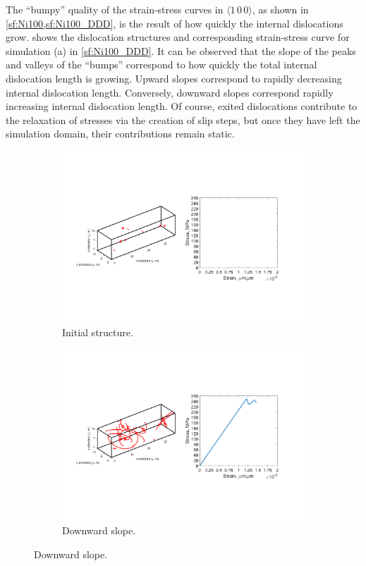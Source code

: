 The ``bumpy'' quality of the strain-stress curves in $\langle 1\, 0\, 0 \rangle$, as shown in \cref{sf:Ni100,sf:Ni100_DDD}, is the result of how quickly the internal dislocations grow.  shows the dislocation structures and corresponding strain-stress curve for simulation (a) in \cref{sf:Ni100_DDD}. It can be observed that the slope of the peaks and valleys of the ``bumps'' correspond to how quickly the total internal dislocation length is growing. Upward slopes correspond to rapidly decreasing internal dislocation length. Conversely, downward slopes correspond rapidly increasing internal dislocation length. Of course, exited dislocations contribute to the relaxation of stresses via the creation of slip steps, but once they have left the simulation domain, their contributions remain static.
\begin{figure}
    \centering
    \begin{subfigure}[t]{\linewidth}
        \centering
        \includegraphics[trim={1.75cm 5cm 2.5cm 5.5cm},clip,width=\linewidth]{../data/11-Mar-2021_8_tensile_ni_100_0.pdf}
        \caption{Initial structure.}
    \end{subfigure}

    \begin{subfigure}[t]{\linewidth}
        \centering
        \includegraphics[trim={1.75cm 5cm 2.5cm 5.5cm},clip,width=\linewidth]{../data/11-Mar-2021_8_tensile_ni_100_60000.pdf}
        \caption{Downward slope.}
    \end{subfigure}


\end{figure}
